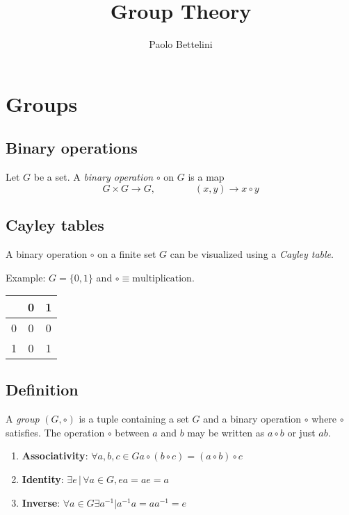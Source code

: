 \documentclass{article}
\title{Group Theory}
\author{Paolo Bettelini}
\date{}
\begin{document}
\maketitle
\tableofcontents
\pagebreak

\section{Groups}

\subsection{Binary operations}

Let \(G\) be a set. A \textit{binary operation} \(\circ\) on \(G\) is a map
\[
    G \times G \to G,
    \quad\quad\quad\quad
    (x,y) \to x \circ y
\]


\subsection{Cayley tables}

A binary operation \(\circ\) on a finite set \(G\) can be
visualized using a \textit{Cayley table}.

Example: \(G=\{0,1\}\) and \(\circ \equiv \text{multiplication}\).
\begin{tabular}{|c|c|c|}
    \hline
    \circ{} & 0 & 1 \\
    \hline
    0 & 0 & 0 \\
    \hline
    1 & 0 & 1 \\
    \hline
\end{tabular}

\subsection{Definition}

A \textit{group} \((G,\circ)\) is a tuple containing a set \(G\) and
a binary operation \(\circ\) where \(\circ\) satisfies.
The operation \(\circ\) between \(a\) and \(b\) may be written as
\(a\circ b\) or just \(ab\).

\begin{enumerate}
    \item \textbf{Associativity}: \(\forall a,b,c\in G a \circ (b \circ c) = (a \circ b) \circ c\)
    \item \textbf{Identity}: \(\exists e \,|\, \forall a \in G, ea=ae=a\) 
    \item \textbf{Inverse}: \(\forall a\in G \exists a^{-1} | a^{-1}a = aa^{-1} = e\)
\end{enumerate}
\end{document}
